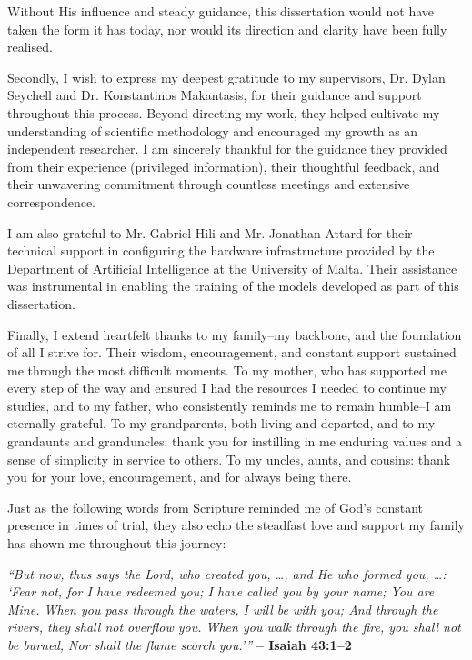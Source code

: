 \bigskip\bigskip

\noindent Without His influence and steady guidance, this dissertation would not have taken the form it has today, nor would its direction and clarity have been fully realised.

\bigskip

\noindent Secondly, I wish to express my deepest gratitude to my supervisors, Dr. Dylan Seychell and Dr. Konstantinos Makantasis, for their guidance and support throughout this process. Beyond directing my work, they helped cultivate my understanding of scientific methodology and encouraged my growth as an independent researcher. I am sincerely thankful for the guidance they provided from their experience (privileged information), their thoughtful feedback, and their unwavering commitment through countless meetings and extensive correspondence.

\bigskip

\noindent I am also grateful to Mr. Gabriel Hili and Mr. Jonathan Attard for their technical support in configuring the hardware infrastructure provided by the Department of Artificial Intelligence at the University of Malta. Their assistance was instrumental in enabling the training of the models developed as part of this dissertation.

\bigskip

\noindent Finally, I extend heartfelt thanks to my family--my backbone, and the foundation of all I strive for. Their wisdom, encouragement, and constant support sustained me through the most difficult moments. To my mother, who has supported me every step of the way and ensured I had the resources I needed to continue my studies, and to my father, who consistently reminds me to remain humble--I am eternally grateful. To my grandparents, both living and departed, and to my grandaunts and granduncles: thank you for instilling in me enduring values and a sense of simplicity in service to others. To my uncles, aunts, and cousins: thank you for your love, encouragement, and for always being there.

\bigskip

\noindent Just as the following words from Scripture reminded me of God’s constant presence in times of trial, they also echo the steadfast love and support my family has shown me throughout this journey:

\bigskip\bigskip

\noindent
\textit{``But now, thus says the Lord, who created you, \ldots, and He who formed you, \ldots : ‘Fear not, for I have redeemed you; I have called you by your name; You are Mine. When you pass through the waters, I will be with you; And through the rivers, they shall not overflow you. When you walk through the fire, you shall not be burned, Nor shall the flame scorch you.’''} \textbf{-- Isaiah 43:1–2}

